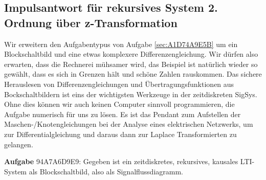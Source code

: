 \newpage
\subsection{Impulsantwort für rekursives System 2. Ordnung über z-Transformation}
\label{sec:94A7A6D9E9}
\begin{Ziel}
Wir erweitern den Aufgabentypus von Aufgabe \ref{sec:A1D74A9E5B} um ein Blockschaltbild
und eine etwas komplexere Differenzengleichung. Wir dürfen also erwarten, dass
die Rechnerei mühsamer wird, das Beispiel ist natürlich wieder so gewählt, dass
es sich in Grenzen hält und schöne Zahlen rauskommen. Das sichere Herauslesen
von Differenzengleichungen und Übertragungsfunktionen aus Bockschaltbildern
ist eins der wichtigsten Werkzeuge in der zeitdiskreten SigSys. Ohne dies
können wir auch keinen Computer sinnvoll programmieren, die Aufgabe numerisch
für uns zu lösen. Es ist das Pendant
zum Aufstellen der Maschen-/Knotengleichungen bei der Analyse eines elektrischen
Netzwerks, um zur Differentialgleichung und daraus dann zur Laplace Transformierten
zu gelangen.
\end{Ziel}
\textbf{Aufgabe} {\tiny 94A7A6D9E9}: Gegeben ist ein zeitdiskretes, rekursives,
kausales LTI-System als Blockschaltbild, also als Signalflussdiagramm.
